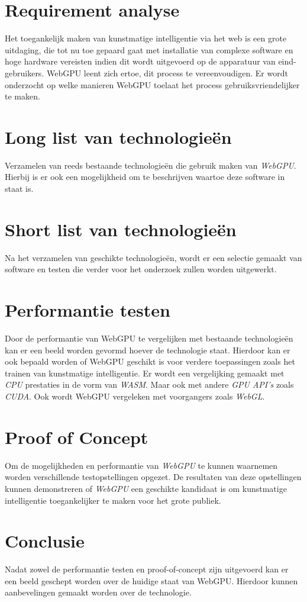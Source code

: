 \section{Requirement analyse}

Het toegankelijk maken van kunstmatige intelligentie via het web is een grote uitdaging, die tot nu toe gepaard gaat met installatie van complexe software en hoge hardware vereisten indien dit wordt uitgevoerd op de apparatuur van eind-gebruikers. WebGPU leent zich ertoe, dit process te vereenvoudigen. Er wordt onderzocht op welke manieren WebGPU toelaat het process gebruiksvriendelijker te maken. 

\section{Long list van technologieën}

Verzamelen van reeds bestaande technologieën die gebruik maken van \textit{WebGPU}. Hierbij is er ook een mogelijkheid om te beschrijven waartoe deze software in staat is.

\section{Short list van technologieën}

Na het verzamelen van geschikte technologieën, wordt er een selectie gemaakt van software en testen die verder voor het onderzoek zullen worden uitgewerkt.

\section{Performantie testen}

Door de performantie van WebGPU te vergelijken met bestaande technologieën kan er een beeld worden gevormd hoever de technologie staat. Hierdoor kan er ook bepaald worden of WebGPU geschikt is voor verdere toepassingen zoals het trainen van kunstmatige intelligentie. Er wordt een vergelijking gemaakt met \textit{CPU} prestaties in de vorm van \textit{WASM}. Maar ook met andere \textit{GPU API's} zoals \textit{CUDA}. Ook wordt WebGPU vergeleken met voorgangers zoals \textit{WebGL}.

\section{Proof of Concept}

Om de mogelijkheden en performantie van \textit{WebGPU} te kunnen waarnemen worden verschillende testopstellingen opgezet. De resultaten van deze opstellingen kunnen demonstreren of \textit{WebGPU} een geschikte kandidaat is om kunstmatige intelligentie toegankelijker te maken voor het grote publiek.

\section{Conclusie}

Nadat zowel de performantie testen en proof-of-concept zijn uitgevoerd kan er een beeld geschept worden over de huidige staat van WebGPU. Hierdoor kunnen aanbevelingen gemaakt worden over de technologie.

